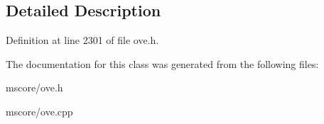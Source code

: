 \subsection{Detailed Description}


Definition at line 2301 of file ove.\+h.



The documentation for this class was generated from the following files\+:\begin{DoxyCompactItemize}
\item 
mscore/ove.\+h\item 
mscore/ove.\+cpp\end{DoxyCompactItemize}
